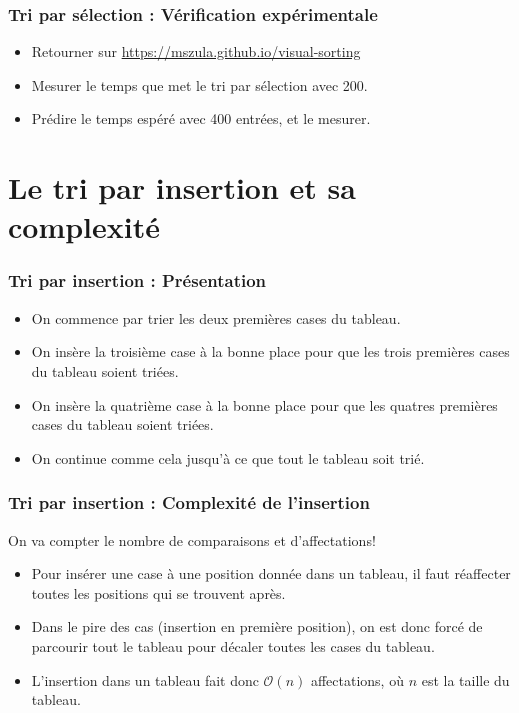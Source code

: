 \documentclass[aspectratio=169]{beamer}
\begin{document}
\begin{frame}
  \frametitle{Tri par sélection : Vérification expérimentale}
  \begin{itemize}
  \item Retourner sur \alert{\url{https://mszula.github.io/visual-sorting}}
  \item Mesurer le temps que met le tri par sélection avec 200.
  \item Prédire le temps espéré avec 400 entrées, et le mesurer.
  \end{itemize}
\end{frame}

\section{Le tri par insertion et sa complexité}
\begin{frame}
  \frametitle{Tri par insertion : Présentation}
  \begin{itemize}
  \item On commence par trier les deux premières cases du tableau.

  \item On insère la troisième case à la bonne place pour que les trois
    premières cases du tableau soient triées.

  \item On insère la quatrième case à la bonne place pour que les quatres
    premières cases du tableau soient triées.

  \item On continue comme cela jusqu'à ce que tout le tableau soit trié.
  \end{itemize}
\end{frame}

\begin{frame}
  \frametitle{Tri par insertion : Complexité de l'insertion}
  \alert{On va compter le nombre de comparaisons et d'affectations!}
  \begin{itemize}
  \item Pour insérer une case à une position donnée dans un tableau, il faut
    réaffecter toutes les positions qui se trouvent après.

  \item Dans le pire des cas (insertion en première position), on est donc forcé
    de parcourir tout le tableau pour décaler toutes les cases du tableau.

  \item L'insertion dans un tableau fait donc \(\mathcal{O}(n)\) affectations,
    où \(n\) est la taille du tableau.
  \end{itemize}
\end{frame}
\end{document}
